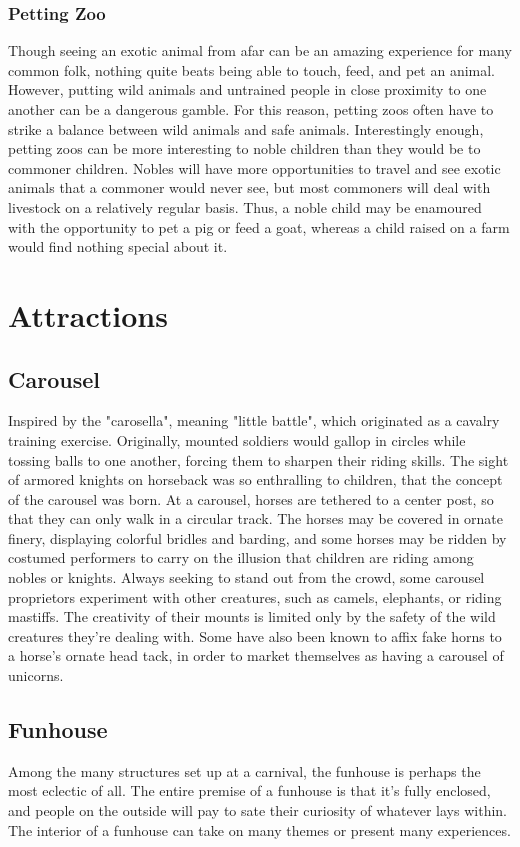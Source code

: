 \documentclass[10pt,a4paper,twoside,twocolumn,openany,bg=print,nodeprecatedcode]{dndbook}
\begin{document}
\subsection{Petting Zoo}
Though seeing an exotic animal from afar can be an amazing experience for many common folk, nothing quite beats being able to touch, feed, and pet an animal. However, putting wild animals and untrained people in close proximity to one another can be a dangerous gamble. For this reason, petting zoos often have to strike a balance between wild animals and safe animals. Interestingly enough, petting zoos can be more interesting to noble children than they would be to commoner children. Nobles will have more opportunities to travel and see exotic animals that a commoner would never see, but most commoners will deal with livestock on a relatively regular basis. Thus, a noble child may be enamoured with the opportunity to pet a pig or feed a goat, whereas a child raised on a farm would find nothing special about it.
\chapter{Attractions}
\section{Carousel}
Inspired by the "carosella", meaning "little battle", which originated as a cavalry training exercise. Originally, mounted soldiers would gallop in circles while tossing balls to one another, forcing them to sharpen their riding skills. The sight of armored knights on horseback was so enthralling to children, that the concept of the carousel was born. At a carousel, horses are tethered to a center post, so that they can only walk in a circular track. The horses may be covered in ornate finery, displaying colorful bridles and barding, and some horses may be ridden by costumed performers to carry on the illusion that children are riding among nobles or knights. Always seeking to stand out from the crowd, some carousel proprietors experiment with other creatures, such as camels, elephants, or riding mastiffs. The creativity of their mounts is limited only by the safety of the wild creatures they're dealing with. Some have also been known to affix fake horns to a horse's ornate head tack, in order to market themselves as having a carousel of unicorns. 
\section{Funhouse}
Among the many structures set up at a carnival, the funhouse is perhaps the most eclectic of all. The entire premise of a funhouse is that it's fully enclosed, and people on the outside will pay to sate their curiosity of whatever lays within. The interior of a funhouse can take on many themes or present many experiences.
\end{document}
